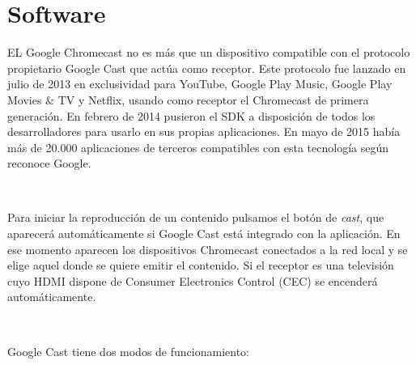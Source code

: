 \section{Software}

EL Google Chromecast no es más que un dispositivo compatible con el protocolo propietario Google Cast que actúa como receptor.
Este protocolo fue lanzado en julio de 2013 en exclusividad para YouTube, Google Play Music, Google Play Movies \& TV y Netflix, usando como receptor el Chromecast de primera generación. En febrero de 2014 pusieron el SDK a disposición de todos los desarrolladores para usarlo en sus propias aplicaciones.
En mayo de 2015 había más de 20.000 aplicaciones de terceros compatibles con esta tecnología según reconoce Google.

\

Para iniciar la reproducción de un contenido pulsamos el botón de \textit{cast}, que aparecerá automáticamente si Google Cast está integrado con la aplicación.
En ese momento aparecen los dispositivos Chromecast conectados a la red local y se elige aquel donde se quiere emitir el contenido.
Si el receptor es una televisión cuyo HDMI dispone de Consumer Electronics Control (CEC) se encenderá automáticamente.

\

Google Cast tiene dos modos de funcionamiento:


